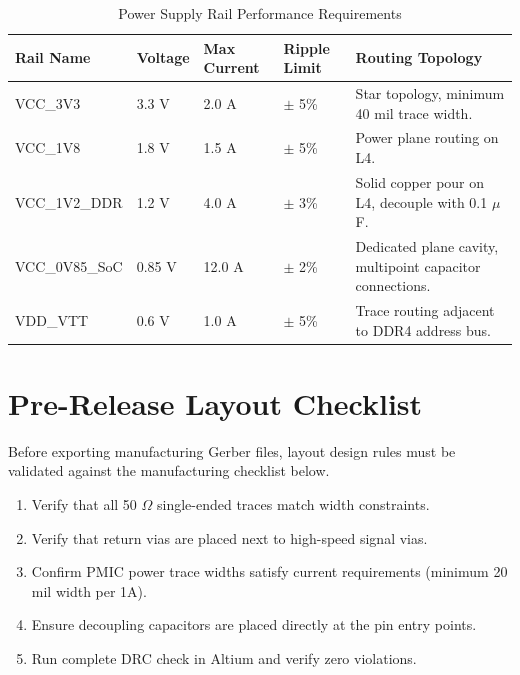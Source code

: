 \documentclass[11pt,a4paper]{article}
\begin{document}
\begin{table}[h]
\centering
\fontsize{9}{11}\selectfont
\begin{tabularx}{\textwidth}{l l l l X}
\rowcolor{primary}
\color{white}\textbf{Rail Name} & \color{white}\textbf{Voltage} & \color{white}\textbf{Max Current} & \color{white}\textbf{Ripple Limit} & \color{white}\textbf{Routing Topology} \\
\midrule
VCC\_3V3 & 3.3 V & 2.0 A & $\pm$ 5\% & Star topology, minimum 40 mil trace width. \\
\rowcolor{lightbg}
VCC\_1V8 & 1.8 V & 1.5 A & $\pm$ 5\% & Power plane routing on L4. \\
VCC\_1V2\_DDR & 1.2 V & 4.0 A & $\pm$ 3\% & Solid copper pour on L4, decouple with 0.1 $\mu$F. \\
\rowcolor{lightbg}
VCC\_0V85\_SoC & 0.85 V & 12.0 A & $\pm$ 2\% & Dedicated plane cavity, multipoint capacitor connections. \\
VDD\_VTT & 0.6 V & 1.0 A & $\pm$ 5\% & Trace routing adjacent to DDR4 address bus. \\
\bottomrule
\end{tabularx}
\caption{Power Supply Rail Performance Requirements}
\label{tab:power}
\end{table}

\section{Pre-Release Layout Checklist}
Before exporting manufacturing Gerber files, layout design rules must be validated against the manufacturing checklist below.

\begin{enumerate}[label=\lbrack\ \rbrack, leftmargin=*]
    \item Verify that all 50 $\Omega$ single-ended traces match width constraints.
    \item Verify that return vias are placed next to high-speed signal vias.
    \item Confirm PMIC power trace widths satisfy current requirements (minimum 20 mil width per 1A).
    \item Ensure decoupling capacitors are placed directly at the pin entry points.
    \item Run complete DRC check in Altium and verify zero violations.
\end{enumerate}
\end{document}
